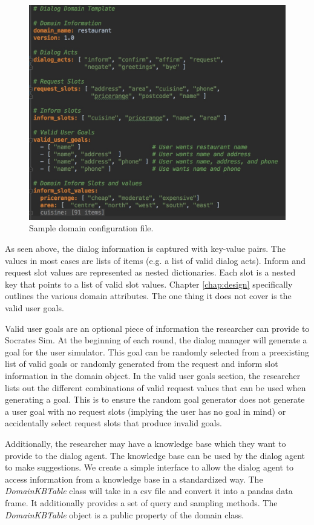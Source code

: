 \begin{figure}[h!]
	\centering
	\includegraphics[scale=.25]{diagrams/sample_domain.jpeg}
	\caption{ Sample domain configuration file. }
	\label{fig:sample_domain}
\end{figure}

As seen above, the dialog information is captured with key-value pairs. The values in most cases are lists of items (e.g. a list of valid dialog acts). Inform and request slot values are represented as nested dictionaries. Each slot is a nested key that points to a list of valid slot values. Chapter \ref{chap:design} specifically outlines the various domain attributes. The one thing it does not cover is the valid user goals. 

Valid user goals are an optional piece of information the researcher can provide to Socrates Sim. At the beginning of each round, the dialog manager will generate a goal for the user simulator. This goal can be randomly selected from a preexisting list of valid goals or randomly generated from the request and inform slot information in the domain object. In the valid user goals section, the researcher lists out the different combinations of valid request values that can be used when generating a goal. This is to ensure the random goal generator does not generate a user goal with no request slots (implying the user has no goal in mind) or accidentally select request slots that produce invalid goals.  

Additionally, the researcher may have a knowledge base which they want to provide to the dialog agent. The knowledge base can be used by the dialog agent to make suggestions. We create a simple interface to allow the dialog agent to access information from a knowledge base in a standardized way. The \textit{DomainKBTable} class will take in a csv file and convert it into a pandas data frame. It additionally provides a set of query and sampling methods. The \textit{DomainKBTable} object is a public property of the domain class.

